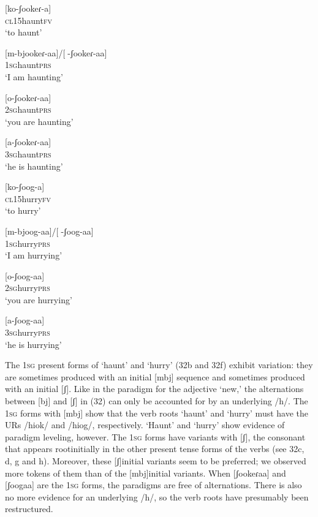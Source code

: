 \documentclass[output=paper]{langsci/langscibook}
\begin{document}
\ea{}
 [ko-ʃookeɾ-a]\\{}
\textsc{cl15}haunt\textsc{fv}\\{}
\glt ‘to haunt’
\z


\ea{}
 [m-bjookeɾ-aa]/[-ʃookeɾ-aa]\\{}
\textsc{1sg}haunt\textsc{prs}\\{}
\glt ‘I am haunting’
\z


\ea{}
 [o-ʃookeɾ-aa]\\{}
\textsc{2sg}haunt\textsc{prs}\\{}
\glt ‘you are haunting’
\z


\ea{}
 [a-ʃookeɾ-aa]\\{}
\textsc{3sg}haunt\textsc{prs}\\{}
\glt ‘he is haunting’
\z


\ea{}
 [ko-ʃoog-a]\\{}
\textsc{cl15}hurry\textsc{fv}\\{}
\glt ‘to hurry’
\z


\ea{}
 [m-bjoog-aa]/[-ʃoog-aa]\\{}
\textsc{1sg}hurry\textsc{prs}\\{}
\glt ‘I am hurrying’
\z


\ea{}
 [o-ʃoog-aa]\\{}
\textsc{2sg}hurry\textsc{prs}\\{}
\glt ‘you are hurrying’
\z


\ea{}
 [a-ʃoog-aa]\\{}
\textsc{3sg}hurry\textsc{prs}\\{}
\glt ‘he is hurrying’
\z

The 1\textsc{sg} present forms of ‘haunt’ and ‘hurry’ (32b and 32f) exhibit variation: they are sometimes produced with an initial [mbj] sequence and sometimes produced with an initial [ʃ]. Like in the paradigm for the adjective ‘new,’ the alternations between [bj] and [ʃ] in (32) can only be accounted for by an underlying /h/. The 1\textsc{sg} forms with [mbj] show that the verb roots ‘haunt’ and ‘hurry’ must have the URs /hiok/ and /hiog/, respectively. ‘Haunt’ and ‘hurry’ show evidence of paradigm leveling, however. The 1\textsc{sg} forms have variants with [ʃ], the consonant that appears rootinitially in the other present tense forms of the verbs (see 32c, d, g and h). Moreover, these [ʃ]initial variants seem to be preferred; we observed more tokens of them than of the [mbj]initial variants. When [ʃookeɾaa] and [ʃoogaa] are the 1\textsc{sg} forms, the paradigms are free of alternations. There is also no more evidence for an underlying /h/, so the verb roots have presumably been restructured. 
\end{document}

